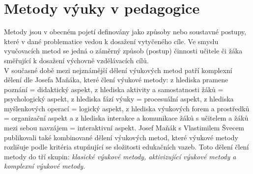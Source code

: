 
\chapter{Metody výuky v pedagogice}

Metody jsou v obecném pojetí definovány jako způsoby nebo soustavné postupy, které v dané problematice vedou k dosažení vytyčeného cíle. Ve smyslu vyučovacích metod se jedná o záměrný způsob (postup) činnosti učitele či žáka směřující k dosažení výchovně vzdělávacích cílů. \cite{dvoracek2000,vanecek2016}\\

V současné době mezi nejznámější dělení výukových metod patří
komplexní dělení dle Josefa Maňáka, které člení výukové metody:
 z hlediska pramene poznání = didaktický aspekt, z hlediska aktivity a samostatnosti žáků = psychologický aspekt, z hlediska fází výuky = procesuální aspekt, z hlediska myšlenkových operací = logický aspekt, z hlediska výukových forem a prostředků = organizační aspekt a z hlediska interakce a komunikace žáků s učitelem a žáků mezi sebou navzájem = interaktivní aspekt. Josef Maňák s Vlastimilem Švecem publikovali také kombinované dělení výukových metod, které výukové metody rozlišuje podle kritéria stupňující se složitosti edukačních vazeb. Toto dělení člení metody do tří skupin: {\it klasické výukové metody, aktivizující výukové metody a komplexní výukové metody.} \cite{slavik2012,zormanova2012}
 
